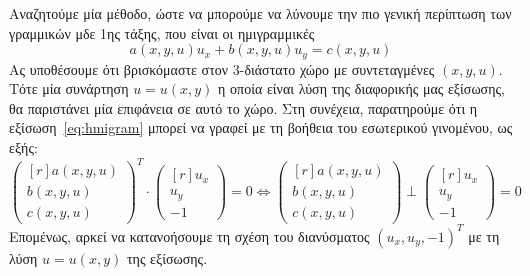 Αναζητούμε μία μέθοδο, ώστε να μπορούμε να λύνουμε την πιο γενική περίπτωση των 
γραμμικών μδε 1ης τάξης, που είναι οι ημιγραμμικές
\begin{equation}\label{eq:hmigram}
  a(x,y,u)u_{x}+b(x,y,u)u_{y}=c(x,y,u) 
\end{equation}
Ας υποθέσουμε ότι βρισκόμαστε στον 3-διάστατο χώρο με συντεταγμένες $ (x,y,u) $. 
Τότε μία συνάρτηση $ u=u(x,y) $ η οποία είναι λύση της διαφορικής μας εξίσωσης, θα 
παριστάνει μία επιφάνεια σε αυτό το χώρο. Στη συνέχεια, παρατηρούμε ότι η
εξίσωση~\eqref{eq:hmigram} μπορεί να γραφεί με τη βοήθεια του εσωτερικού γινομένου, ως
εξής:
\begin{equation}\label{eq:perp}
  \begin{pmatrix*}[r] a(x,y,u) \\ b(x,y,u) \\ c(x,y,u) \end{pmatrix*}^{T} \cdot 
  \begin{pmatrix*}[r] u_{x} \\ u_{y} \\ -1 \end{pmatrix*} = 0 \Leftrightarrow 
  \begin{pmatrix*}[r] a(x,y,u) \\ b(x,y,u) \\ c(x,y,u) \end{pmatrix*} \perp 
  \begin{pmatrix*}[r] u_{x} \\ u_{y} \\ -1 \end{pmatrix*} = 0 
\end{equation}
Επομένως, αρκεί να κατανοήσουμε τη σχέση του διανύσματος $ (u_{x},u_{y},-1)^{T} $ 
με τη λύση $ u=u(x,y) $ της εξίσωσης.

